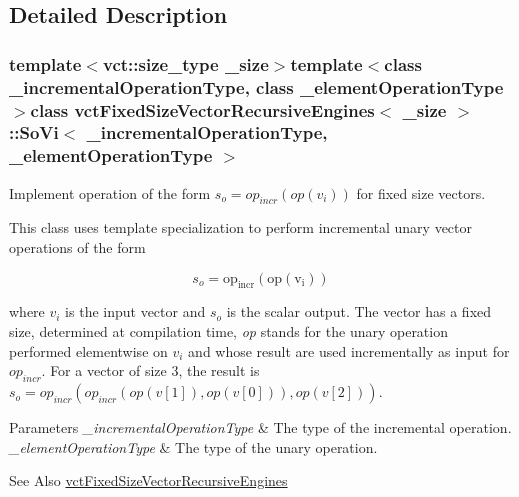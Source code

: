 \subsection{Detailed Description}
\subsubsection*{template$<$vct\-::size\-\_\-type \-\_\-size$>$template$<$class \-\_\-incremental\-Operation\-Type, class \-\_\-element\-Operation\-Type$>$class vct\-Fixed\-Size\-Vector\-Recursive\-Engines$<$ \-\_\-size $>$\-::\-So\-Vi$<$ \-\_\-incremental\-Operation\-Type, \-\_\-element\-Operation\-Type $>$}

Implement operation of the form $s_o = op_{incr}(op(v_i))$ for fixed size vectors. 

This class uses template specialization to perform incremental unary vector operations of the form

\[ s_o = \mathrm{op_{incr}(\mathrm{op}(v_i))} \]

where $v_i$ is the input vector and $s_o$ is the scalar output. The vector has a fixed size, determined at compilation time, {\itshape op} stands for the unary operation performed elementwise on $v_i$ and whose result are used incrementally as input for $op_{incr}$. For a vector of size 3, the result is $s_o = op_{incr}(op_{incr}(op(v[1]), op(v[0])), op(v[2])) $.


\begin{DoxyParams}{Parameters}
{\em \-\_\-incremental\-Operation\-Type} & The type of the incremental operation.\\
\hline
{\em \-\_\-element\-Operation\-Type} & The type of the unary operation.\\
\hline
\end{DoxyParams}
\begin{DoxySeeAlso}{See Also}
\hyperlink{classvct_fixed_size_vector_recursive_engines}{vct\-Fixed\-Size\-Vector\-Recursive\-Engines} 
\end{DoxySeeAlso}


